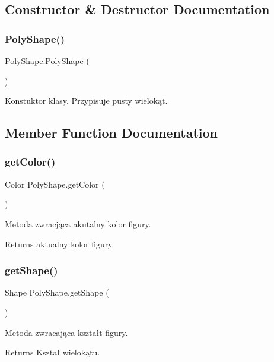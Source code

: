 \subsection{Constructor \& Destructor Documentation}
\mbox{\label{class_poly_shape_a1ac35b96be61a45c324792ed1cbd2463}} 
\subsubsection{Poly\+Shape()}
{\footnotesize\ttfamily Poly\+Shape.\+Poly\+Shape (\begin{DoxyParamCaption}{ }\end{DoxyParamCaption})}

Konstuktor klasy. Przypisuje pusty wielokąt. 

\subsection{Member Function Documentation}
\mbox{\label{class_poly_shape_adc6cbbc34dfdc5cdf492697378baee96}} 
\subsubsection{get\+Color()}
{\footnotesize\ttfamily Color Poly\+Shape.\+get\+Color (\begin{DoxyParamCaption}{ }\end{DoxyParamCaption})}

Metoda zwracjąca akutalny kolor figury. \begin{DoxyReturn}{Returns}
aktualny kolor figury. 
\end{DoxyReturn}
\mbox{\label{class_poly_shape_a76f38be1401146e9d7d29e7fcc352e35}} 
\subsubsection{get\+Shape()}
{\footnotesize\ttfamily Shape Poly\+Shape.\+get\+Shape (\begin{DoxyParamCaption}{ }\end{DoxyParamCaption})}

Metoda zwracająca kształt figury. \begin{DoxyReturn}{Returns}
Kształ wielokątu. 
\end{DoxyReturn}
\mbox{\label{class_poly_shape_ae38333d9b47fd540e8f5c16ba285627a}} 
